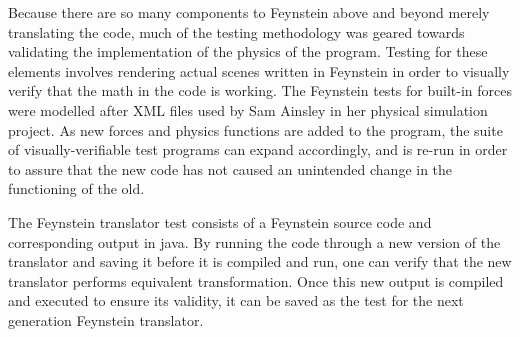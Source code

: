 Because there are so many components to Feynstein above and beyond
merely translating the code, much of the testing methodology was
geared towards validating the implementation of the physics of the
program. Testing for these elements involves rendering actual scenes
written in Feynstein in order to visually verify that the math in the
code is working. The Feynstein tests for built-in forces were modelled
after XML files used by Sam Ainsley in her physical simulation
project. As new forces and physics functions are added to the program,
the suite of visually-verifiable test programs can expand accordingly,
and is re-run in order to assure that the new code has not caused an
unintended change in the functioning of the old.

The Feynstein translator test consists of a Feynstein source code and
corresponding output in java. By running the code through a new
version of the translator and saving it before it is compiled and run,
one can verify that the new translator performs equivalent
transformation. Once this new output is compiled and executed to
ensure its validity, it can be saved as the test for the next
generation Feynstein translator.
